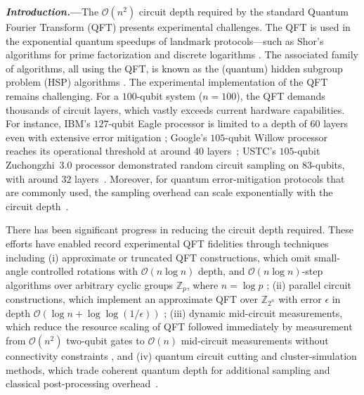 \documentclass[reprint, aps, prl, superscriptaddress]{revtex4-2}
\newcommand{\rev}[1]{\textcolor{revisioncolor}{#1}}
\renewcommand{\section}[1]{\par\medskip\noindent\textbf{{\textit{#1.}---}}}
\begin{document}
\section{Introduction}The $\mathcal{O}(n^2)$ circuit depth required by the standard Quantum Fourier Transform (QFT) presents experimental challenges. The QFT is used in the exponential quantum speedups of landmark protocols—such as Shor's algorithms for prime factorization and discrete logarithms \cite{Simon1997, Shor1994, Shor1997}. The associated family of algorithms, all using the QFT, is known as the (quantum) hidden subgroup problem (HSP) algorithms \cite{Kitaev1995, Jozsa2001, Lomont2004, liu2024information}. The experimental implementation of the QFT remains challenging. For a $100$-qubit system ($n=100$), the QFT demands thousands of circuit layers, which vastly exceeds current hardware capabilities. For instance, IBM's $127$-qubit Eagle processor is limited to a depth of $60$ layers even with extensive error mitigation \cite{kim2023evidence}; Google's $105$-qubit Willow processor reaches its operational threshold at around $40$ layers~\cite{google2025quantum}; USTC's $105$-qubit Zuchongzhi~3.0 processor demonstrated random circuit sampling on $83$-qubits, with around $32$ layers~\cite{Zuchongzhi}. Moreover, for quantum error-mitigation protocols that are commonly used, the sampling overhead can scale exponentially with the circuit depth~\cite{takagi2022fundamental, takagi2023universal}.


There has been significant progress in reducing the circuit depth required. These efforts have enabled record experimental QFT fidelities \cite{aumann2026demonstrating} through techniques including \rev{(i) approximate or truncated QFT constructions, which omit small-angle controlled rotations \cite{Coppersmith2002, park2023reducing} with \(\mathcal{O}(n\log n)\) depth, and
$\mathcal{O}(n\log n)$-step algorithms over arbitrary cyclic groups $\mathbb{Z}_p$, where $n=\log p$ \cite{HalesHallgren2000}; (ii) parallel circuit constructions, which implement an approximate QFT over $\mathbb{Z}_{2^n}$ with error $\epsilon$ in depth $\mathcal{O}(\log n+\log\log(1/\epsilon))$ \cite{CleveWatrous2000}; }(iii) dynamic mid-circuit measurements, which reduce the resource scaling of QFT followed immediately by measurement from \(\mathcal{O}(n^2)\) two-qubit gates to \(\mathcal{O}(n)\) mid-circuit measurements without connectivity constraints \cite{baumer2024quantum}, and (iv) quantum circuit cutting and cluster-simulation methods, which trade coherent quantum depth for additional sampling and classical post-processing overhead~\cite{tang2021cutqc, Peng2020}. 
\end{document}
